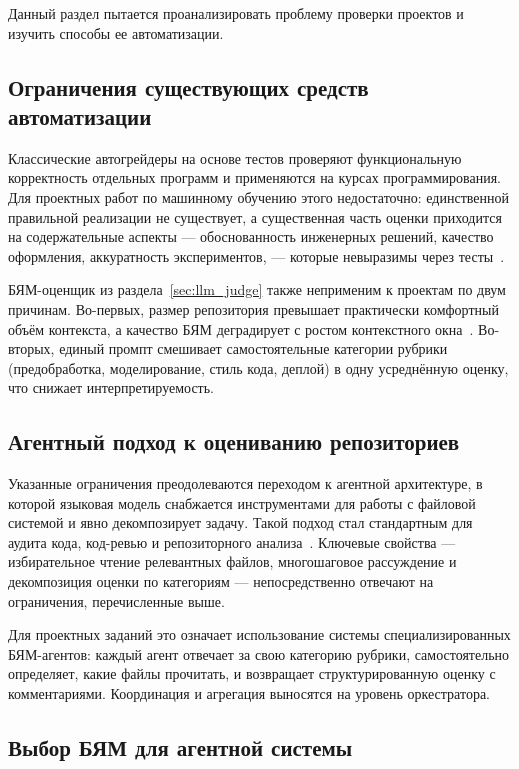Данный раздел пытается проанализировать проблему проверки проектов и изучить
способы ее автоматизации.

\subsection{Ограничения существующих средств автоматизации}

Классические автогрейдеры на основе тестов проверяют функциональную
корректность отдельных программ и применяются на курсах программирования.
Для проектных работ по машинному обучению этого недостаточно:
единственной правильной реализации не существует, а существенная часть
оценки приходится на содержательные аспекты --- обоснованность инженерных
решений, качество оформления, аккуратность экспериментов, --- которые
невыразимы через тесты~\cite{autograderplus2025}.

БЯМ-оценщик из раздела~\ref{sec:llm_judge} также неприменим к проектам по
двум причинам. Во-первых, размер репозитория превышает практически
комфортный объём контекста, а качество БЯМ деградирует с ростом
контекстного окна~\cite{aacrbench2026}. Во-вторых, единый промпт
смешивает самостоятельные категории рубрики (предобработка, моделирование,
стиль кода, деплой) в одну усреднённую оценку, что снижает
интерпретируемость.

\subsection{Агентный подход к оцениванию репозиториев}

Указанные ограничения преодолеваются переходом к агентной архитектуре,
в которой языковая модель снабжается инструментами для работы с файловой
системой и явно декомпозирует задачу. Такой подход стал стандартным для
аудита кода, код-ревью и репозиторного анализа~\cite{repoaudit2025,
aacrbench2026, mlbench2024}. Ключевые свойства --- избирательное чтение
релевантных файлов, многошаговое рассуждение и декомпозиция оценки по
категориям --- непосредственно отвечают на ограничения, перечисленные
выше.

Для проектных заданий это означает использование системы
специализированных БЯМ-агентов: каждый агент отвечает за свою категорию
рубрики, самостоятельно определяет, какие файлы прочитать, и возвращает
структурированную оценку с комментариями. Координация и агрегация
выносятся на уровень оркестратора.

\subsection{Выбор БЯМ для агентной системы}\label{sec:agent_models}

